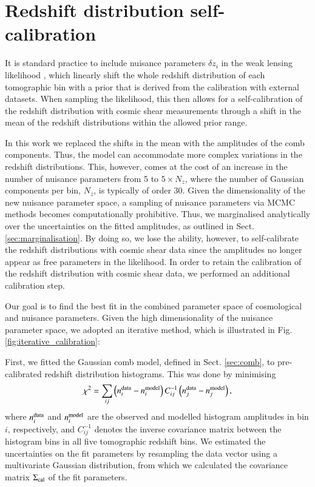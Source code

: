 \documentclass{aa}
\newcommand{\eq}[1]{\begin{equation}  #1 \end{equation}}
\begin{document}
\section{Redshift distribution self-calibration}
\label{sec:calibration}
It is standard practice to include nuisance parameters $\delta z_i$ in the weak lensing likelihood \citep{DES3, HSC2, asgari20}, which linearly shift the whole redshift distribution of each tomographic bin with a prior that is derived from the calibration with external datasets. When sampling the likelihood, this then allows for a self-calibration of the redshift distribution with cosmic shear measurements through a shift in the mean of the redshift distributions within the allowed prior range. 

In this work we replaced the shifts in the mean with the amplitudes of the comb components. Thus, the model can accommodate more complex variations in the redshift distributions. This, however, comes at the cost of an increase in the number of nuisance parameters from 5 to $5 \times N_z$, where the number of Gaussian components per bin, $N_z$, is typically of order 30.  Given the dimensionality of the new nuisance parameter space, a sampling of nuisance parameters via MCMC methods becomes computationally prohibitive. Thus, we marginalised analytically over the uncertainties on the fitted amplitudes, as outlined in Sect. \ref{sec:marginalisation}. By doing so, we lose the ability, however, to self-calibrate the redshift distributions with cosmic shear data since the amplitudes no longer appear as free parameters in the likelihood. In order to retain the calibration of the redshift distribution with cosmic shear data, we performed an additional calibration step.

Our goal is to find the best fit in the combined parameter space of cosmological and nuisance parameters. Given the high dimensionality of the nuisance parameter space, we adopted an iterative method, which is illustrated in Fig. \ref{fig:iterative_calibration}:

First, we fitted the Gaussian comb model, defined in Sect. \ref{sec:comb}, to pre-calibrated redshift distribution histograms. This was done by minimising 
\eq{
\chi^2 = \sum_{ij} \left(n^{\rm data}_i - n^{\rm model}_i\right) C^{-1}_{ij} \left(n^{\rm data}_j - n^{\rm model}_j\right),
} 
where $n^{\rm data}_i$ and $n^{\rm model}_i$ are the observed and modelled histogram amplitudes in bin $i$, respectively, and $C^{-1}_{ij}$ denotes the inverse covariance matrix between the histogram bins in all five tomographic redshift bins. We estimated the uncertainties on the fit parameters by resampling the data vector using a multivariate Gaussian distribution, from which we calculated the covariance matrix $\Sigma_{\rm cal}$ of the fit parameters.
\end{document}
